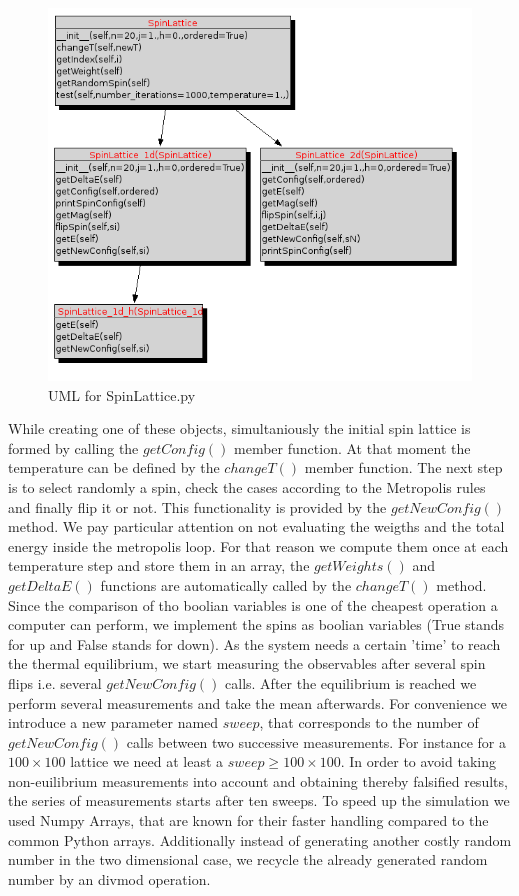 \documentclass[12pt,a4paper,titlepage]{article}
\begin{document}
\begin{figure}[h]
\centering
\includegraphics[width=\linewidth]{Plots/umlSpinLattice}
\caption{UML for SpinLattice.py}
\label{fig:umlspin}

\end{figure}

While creating one of these objects, simultaniously the initial spin lattice is formed by calling the $getConfig()$ member function. At that moment the temperature can be defined by the $changeT()$ member function. The next step is to select randomly a spin, check the cases according to the Metropolis rules and finally flip it or not. This functionality is provided by the $getNewConfig()$ method.
We pay particular attention on not evaluating the weigths and the total energy inside the metropolis loop. For that reason we compute them once at each temperature step and store them in an array, the $getWeights()$ and $getDeltaE()$ functions are automatically called by the $changeT()$ method.
Since the comparison of tho boolian variables is one of the cheapest operation a computer can perform, we implement the spins as boolian variables (True stands for up and False stands for down).
As the system needs a certain 'time' to reach the thermal equilibrium, we start measuring the observables after several spin flips i.e. several $getNewConfig()$ calls. After the equilibrium is reached we perform several measurements and take the mean afterwards. For convenience we introduce a new parameter named $sweep$, that corresponds to the number of $getNewConfig()$ calls between two successive measurements. For instance for a $100\times100$ lattice we need at least a $sweep \geq 100\times100$. In order to avoid taking non-euilibrium measurements into account and obtaining thereby falsified results, the series of measurements starts after ten sweeps.
To speed up the simulation we used Numpy Arrays, that are known for their faster handling compared to the common Python arrays. Additionally instead of generating another costly random number in the two dimensional case, we recycle the already generated random number by an divmod operation.
\end{document}
